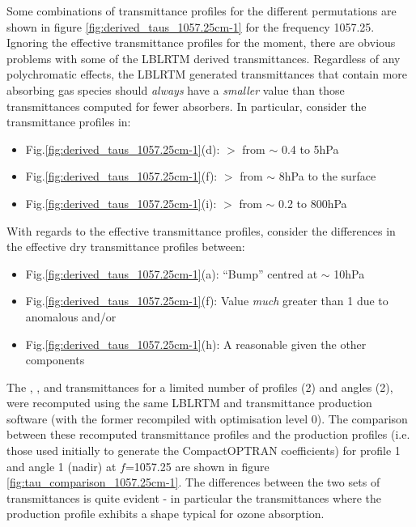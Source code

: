 Some combinations of transmittance profiles for the different permutations are shown in figure \ref{fig:derived_taus_1057.25cm-1} for the frequency 1057.25\invcm. Ignoring the effective transmittance profiles for the moment, there are obvious problems with some of the LBLRTM derived transmittances. Regardless of any polychromatic effects, the LBLRTM generated transmittances that contain more absorbing gas species should \emph{always} have a \emph{smaller} value than those transmittances computed for fewer absorbers. In particular, consider the transmittance profiles in:
\begin{itemize}
  \item{Fig.\ref{fig:derived_taus_1057.25cm-1}(d):  $>$  from $\sim$ 0.4 to 5hPa}
  \item{Fig.\ref{fig:derived_taus_1057.25cm-1}(f):  $>$  from $\sim$ 8hPa to the surface}
  \item{Fig.\ref{fig:derived_taus_1057.25cm-1}(i):  $>$  from $\sim$ 0.2 to 800hPa}
\end{itemize}
With regards to the effective transmittance profiles, consider the differences in the effective dry transmittance profiles between:
\begin{itemize}
  \item{Fig.\ref{fig:derived_taus_1057.25cm-1}(a): ``Bump'' centred at $\sim$ 10hPa}
  \item{Fig.\ref{fig:derived_taus_1057.25cm-1}(f): Value \emph{much} greater than 1 due to anomalous  and/or }
  \item{Fig.\ref{fig:derived_taus_1057.25cm-1}(h): A reasonable  given the other components}
\end{itemize}
The , , and  transmittances for a limited number of profiles (2) and angles (2), were recomputed using the same LBLRTM and transmittance production software (with the former recompiled with optimisation level 0). The comparison between these recomputed transmittance profiles and the production profiles (i.e. those used initially to generate the CompactOPTRAN coefficients) for profile 1 and angle 1 (nadir) at $f$=1057.25\invcm{} are shown in figure \ref{fig:tau_comparison_1057.25cm-1}. The differences between the two sets of transmittances is quite evident - in particular the  transmittances where the production profile exhibits a shape typical for ozone absorption.
